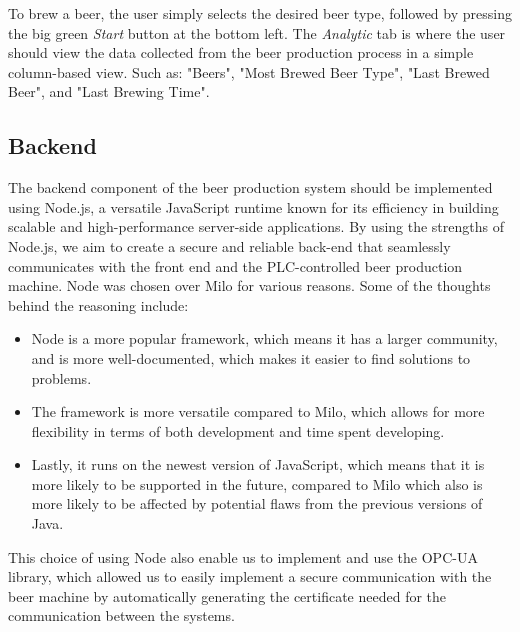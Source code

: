To brew a beer, the user simply selects the desired beer type, followed by pressing the big green \textit{Start} button at the bottom left.
The \textit{Analytic} tab is where the user should view the data collected from the beer production process in a simple column-based view. Such as: "Beers", "Most Brewed Beer Type", "Last Brewed Beer", and "Last Brewing Time". \newline

\subsection{Backend}
The backend component of the beer production system should be implemented using Node.js, a versatile JavaScript runtime known for its efficiency in building scalable and high-performance server-side applications. By using the strengths of Node.js, we aim to create a secure and reliable back-end that seamlessly communicates with the front end and the PLC-controlled beer production machine.\cite{6} \newline
Node was chosen over Milo for various reasons. Some of the thoughts behind the reasoning include:\cite{4}
\begin{itemize}
  \item Node is a more popular framework, which means it has a larger community, and is more well-documented, which makes it easier to find solutions to problems.
  \item The framework is more versatile compared to Milo, which allows for more flexibility in terms of both development and time spent developing.
  \item Lastly, it runs on the newest version of JavaScript, which means that it is more likely to be supported in the future, compared to Milo which also is more likely to be affected by potential flaws from the previous versions of Java. \newline
\end{itemize}
This choice of using Node also enable us to implement and use the OPC-UA library, which allowed us to easily implement a secure communication with the beer machine by automatically generating the certificate needed for the communication between the systems.

